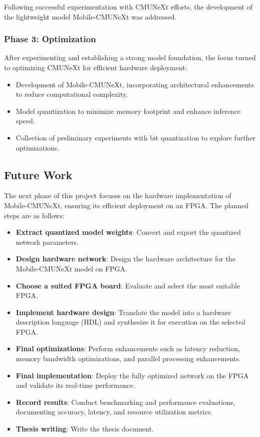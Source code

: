 \documentclass[lettersize,journal]{IEEEtran}
\begin{document}
Following successful experimentation with CMUNeXt efforts, the development of the lightweight model Mobile-CMUNeXt was addressed.

\subsubsection{Phase 3: Optimization}
After experimenting and establishing a strong model foundation, the focus turned to optimizing CMUNeXt for efficient hardware deployment:
\begin{itemize}
    \item Development of Mobile-CMUNeXt, incorporating architectural enhancements to reduce computational complexity.
    \item Model quantization to minimize memory footprint and enhance inference speed.
    \item Collection of preliminary experiments with bit quantization to explore further optimizations.
\end{itemize}

\subsection{Future Work}
The next phase of this project focuses on the hardware implementation of Mobile-CMUNeXt, ensuring its efficient deployment on an FPGA. The planned steps are as follows:

\begin{itemize}
    \item \textbf{Extract quantized model weights}: Convert and export the quantized network parameters.
    \item \textbf{Design hardware network}: Design the hardware architecture for the Mobile-CMUNeXt model on FPGA.
    \item \textbf{Choose a suited FPGA board}: Evaluate and select the most suitable FPGA.
    \item \textbf{Implement hardware design}: Translate the model into a hardware description language (HDL) and synthesize it for execution on the selected FPGA.
    \item \textbf{Final optimizations}: Perform enhancements such as latency reduction, memory bandwidth optimizations, and parallel processing enhancements.
    \item \textbf{Final implementation}: Deploy the fully optimized network on the FPGA and validate its real-time performance.
    \item \textbf{Record results}: Conduct benchmarking and performance evaluations, documenting accuracy, latency, and resource utilization metrics.
    \item \textbf{Thesis writing}: Write the thesis document.
\end{itemize}
\end{document}

